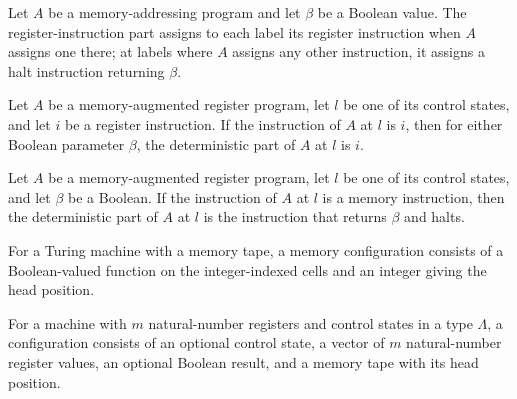 \begin{definition}
\label{Complexity.LogProg.MARM.detPart}
\leanok
{}
Let $A$ be a memory-addressing program and let $\beta$ be a Boolean value. The
register-instruction part assigns to each label its register instruction when $A$
assigns one there; at labels where $A$ assigns any other instruction, it assigns a halt
instruction returning $\beta$.
\end{definition}

\begin{lemma}
\label{Complexity.LogProg.MARM.detPart_det}
\leanok
{}
Let $A$ be a memory-augmented register program, let $l$ be one of its control states,
and let $i$ be a register instruction. If the instruction of $A$ at $l$ is $i$, then for
either Boolean parameter $\beta$, the deterministic part of $A$ at $l$ is $i$.
\end{lemma}

\begin{lemma}
\label{Complexity.LogProg.MARM.detPart_mem}
\leanok
{}
Let $A$ be a memory-augmented register program, let $l$ be one of its control states,
and let $\beta$ be a Boolean. If the instruction of $A$ at $l$ is a memory instruction,
then the deterministic part of $A$ at $l$ is the instruction that returns $\beta$ and
halts.
\end{lemma}

\begin{definition}
\label{Complexity.LogProg.Mem}
\leanok
For a Turing machine with a memory tape, a memory configuration consists of a
Boolean-valued function on the integer-indexed cells and an integer giving the head
position.
\end{definition}

\begin{definition}
\label{Complexity.LogProg.MConf}
\leanok
{}
For a machine with $m$ natural-number registers and control states in a type $\Lambda$,
a configuration consists of an optional control state, a vector of $m$ natural-number
register values, an optional Boolean result, and a memory tape with its head position.
\end{definition}

